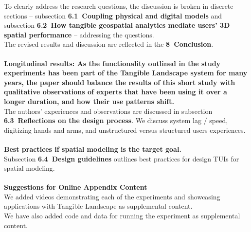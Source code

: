 \documentclass[prodmode,acmtochi]{acmsmall} %
\begin{document}
To clearly address the research questions, the discussion
is broken in discrete sections -- 
subsection \textbf{6.1~Coupling physical and digital models}
and 
subsection \textbf{6.2~How tangible geospatial analytics mediate users’ 3D spatial performance} 
-- addressing the questions. \\

The revised results and discussion are reflected in the \textbf{8~Conclusion}.\\

\hrulefill \\

\textbf{Longitudinal results: As the functionality outlined in the study experiments has been part of the Tangible Landscape system for many years, the paper should balance the results of this short study with qualitative observations of experts that have been using it over a longer duration, and how their use patterns shift.}\\

The authors' experiences and observations are discussed in 
subsection \textbf{6.3~Reflections on the design process}.
We discuss system lag / speed, digitizing hands and arms,
and unstructured versus structured users experiences. \\

\hrulefill \\

\textbf{Best practices if spatial modeling is the target goal.}\\

Subsection \textbf{6.4~Design guidelines} outlines best practices
for design TUIs for spatial modeling. \\


\hrulefill \\

\textbf{Suggestions for Online Appendix Content} \\

We added videos demonstrating each of the experiments 
and showcasing applications with Tangible Landscape
as supplemental content.\\

We have also added code and data for running the experiment
as supplemental content.\\



%



\end{document}
